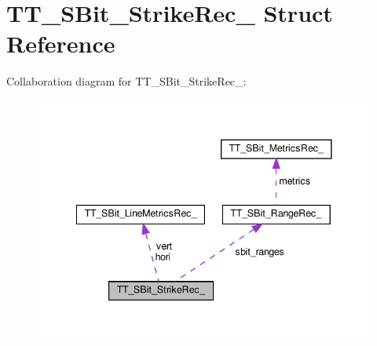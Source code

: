 \hypertarget{structTT__SBit__StrikeRec__}{}\section{T\+T\+\_\+\+S\+Bit\+\_\+\+Strike\+Rec\+\_\+ Struct Reference}
\label{structTT__SBit__StrikeRec__}


Collaboration diagram for T\+T\+\_\+\+S\+Bit\+\_\+\+Strike\+Rec\+\_\+\+:
\nopagebreak
\begin{figure}[H]
\begin{center}
\leavevmode
\includegraphics[width=341pt]{structTT__SBit__StrikeRec____coll__graph}
\end{center}
\end{figure}
